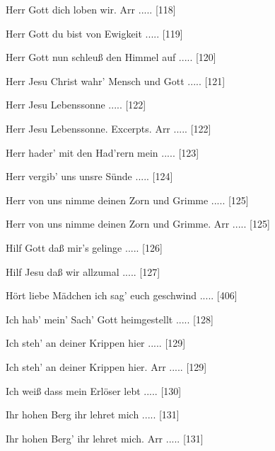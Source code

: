 \documentclass[twocolumn]{book}
\begin{document}
\newline 
Herr Gott dich loben wir. Arr ..... [118]

\newline 
Herr Gott du bist von Ewigkeit ..... [119]

\newline 
Herr Gott nun schleuß den Himmel auf ..... [120]

\newline 
Herr Jesu Christ wahr' Mensch und Gott ..... [121]

\newline 
Herr Jesu Lebenssonne ..... [122]

\newline 
Herr Jesu Lebenssonne. Excerpts. Arr ..... [122]

\newline 
Herr hader' mit den Had'rern mein ..... [123]

\newline 
Herr vergib' uns unsre Sünde ..... [124]

\newline 
Herr von uns nimme deinen Zorn und Grimme ..... [125]

\newline 
Herr von uns nimme deinen Zorn und Grimme. Arr ..... [125]

\newline 
Hilf Gott daß mir's gelinge ..... [126]

\newline 
Hilf Jesu daß wir allzumal ..... [127]

\newline 
Hört liebe Mädchen ich sag' euch geschwind ..... [406]

\newline 
Ich hab' mein' Sach' Gott heimgestellt ..... [128]

\newline 
Ich steh' an deiner Krippen hier ..... [129]

\newline 
Ich steh' an deiner Krippen hier. Arr ..... [129]

\newline 
Ich weiß dass mein Erlöser lebt ..... [130]

\newline 
Ihr hohen Berg ihr lehret mich ..... [131]

\newline 
Ihr hohen Berg' ihr lehret mich. Arr ..... [131]
\end{document}
